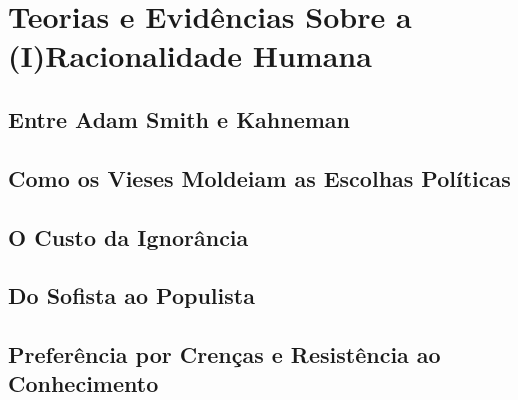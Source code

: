 \chapter{Teorias e Evidências Sobre a (I)Racionalidade Humana} %




\section{Entre Adam Smith e Kahneman} %





\section{Como os Vieses Moldeiam as Escolhas Políticas} %

\section{O Custo da Ignorância} %


\section{Do Sofista ao Populista} %



\section{Preferência por Crenças e Resistência ao Conhecimento}



